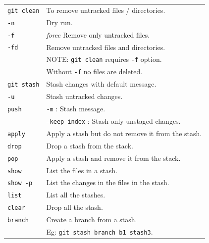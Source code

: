 \begin{tabularx}{\linewidth}{lX}
\texttt{git clean}      & To remove untracked files / directories.\\
\texttt{-n}             & Dry run.\\
\texttt{-f}             & \textit{force} Remove only untracked files.\\
\texttt{-fd}            & Remove untracked files and directories.\\
                        & NOTE: \texttt{git clean} requires \texttt{-f} option.\\
                        & Without \texttt{-f} no files are deleted. \\
\hline


\texttt{git stash}      & Stash changes with default message.\\
\texttt{-u}             & Stash untracked changes.\\
\texttt{push}           & \texttt{-m} : Stash message.\\
                        & \texttt{--keep-index} : Stash only unstaged changes.\\
\texttt{apply}          & Apply a stash but do not remove it from the stash.\\
\texttt{drop}           & Drop a stash from the stack.\\
\texttt{pop}            & Apply a stash and remove it from the stack.\\
\texttt{show}           & List the files in a stash.\\
\texttt{show -p}        & List the changes in the files in the stash.\\
\texttt{list}           & List all the stashes.\\
\texttt{clear}          & Drop all the stash.\\
\texttt{branch}         & Create a branch from a stash.\\
                        & Eg: \texttt{git stash branch b1 stash\@{3}}.\\
\hline

\end{tabularx}


\vfill\null
\columnbreak

